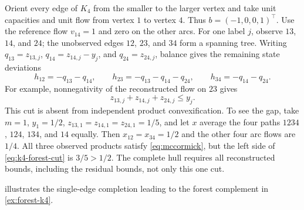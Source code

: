 \begin{example}\label{ex:forest-k4}
Orient every edge of $K_4$ from the smaller to the larger vertex and take
unit capacities and unit flow from vertex $1$ to vertex $4$. Thus
$b=(-1,0,0,1)^\top$. Use the reference flow $v_{14}=1$ and zero on the
other arcs. For one label $j$, observe $13$, $14$, and $24$; the unobserved
edges $12$, $23$, and $34$ form a spanning tree. Writing
$q_{13}=z_{13,j}$, $q_{14}=z_{14,j}-y_j$, and $q_{24}=z_{24,j}$, balance
gives the remaining state deviations
\[
 h_{12}=-q_{13}-q_{14},\qquad
 h_{23}=-q_{13}-q_{14}-q_{24},\qquad
 h_{34}=-q_{14}-q_{24}.
\]
For example, nonnegativity of the reconstructed flow on $23$ gives
\begin{equation}\label{eq:k4-forest-cut}
 z_{13,j}+z_{14,j}+z_{24,j}\le y_j.
\end{equation}
This cut is absent from independent product convexification. To see the
gap, take $m=1$, $y_1=1/2$, $z_{13,1}=z_{14,1}=z_{24,1}=1/5$, and let
$x$ average the four paths $1234$, $124$, $134$, and $14$ equally. Then
$x_{12}=x_{34}=1/2$ and the other four arc flows are $1/4$. All three
observed products satisfy \eqref{eq:mccormick}, but the left side of
\eqref{eq:k4-forest-cut} is $3/5>1/2$. The complete hull requires all
reconstructed bounds, including the residual bounds, not only this one cut.
\end{example}
 illustrates the single-edge completion
leading to the forest complement in \cref{ex:forest-k4}.

